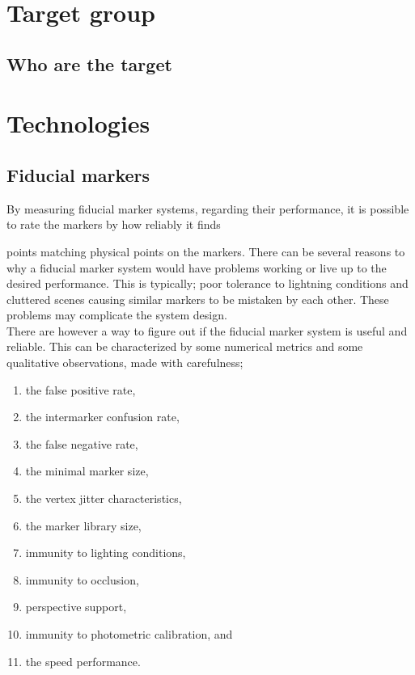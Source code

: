 	\section{Target group}\label{sec:targetGroup}
		\subsection{Who are the target }
		
	\section{Technologies}\label{sec:technologies}			

			\subsection{Fiducial markers}\label{sec:fiducialMarkers}
				By measuring fiducial marker systems, regarding their performance, it is possible to rate the markers by how reliably it finds 
				
				 points matching physical points on the markers. There can be several reasons to why a fiducial marker system would have problems working or live up to the desired performance. This is typically; poor tolerance to lightning conditions and cluttered scenes causing similar markers to be mistaken by each other\cite{fiducialMarkers}. These problems may complicate the system design.\\
				
				There are however a way to figure out if the fiducial marker system is useful and reliable. This can be characterized by some numerical metrics and some qualitative observations, made with carefulness;\\
				\begin{enumerate}
					\item the false positive rate,
					\item the intermarker confusion rate,
					\item the false negative rate,
					\item the minimal marker size,
					\item the vertex jitter characteristics,
					\item the marker library size,
					\item immunity to lighting conditions,
					\item immunity to occlusion,
					\item perspective support,
					\item immunity to photometric calibration, and
					\item the speed performance.\\
				\end{enumerate}
				
